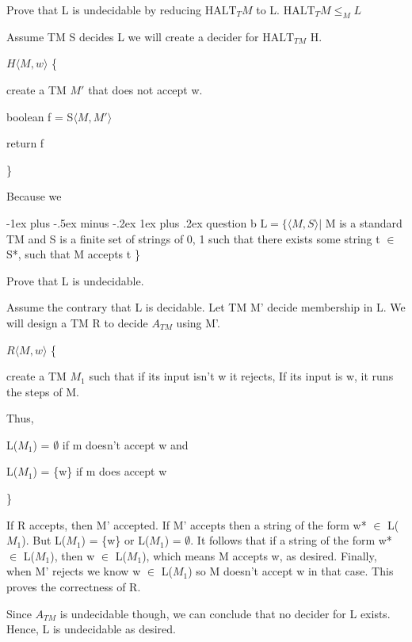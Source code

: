 \documentclass[10pt,landscape]{article}
\makeatletter
\renewcommand{\subsubsection}{\@startsection{subsubsection}{3}{0mm}%
                                {-1ex plus -.5ex minus -.2ex}%
                                {1ex plus .2ex}%
                                {\normalfont\small\bfseries}}
\makeatother
\begin{document}
\begin{multicols}{3}
Prove that L is undecidable by reducing $\mathrm{HALT}_TM$ to L.
$\mathrm{HALT}_TM \leq_M L$

Assume TM S decides L we will create a decider for $\mathrm{HALT}_{TM}$ H.

\begin{algorithm}[H]
 $H \langle{ M, w \rangle}$ \{

 create a TM $M'$ that does not accept w.

 boolean f = S$\langle{ M, M' \rangle}$
 
 return f

 \}
\end{algorithm}

Because we 

\subsubsection{question b}
$\mathrm{L} = \{ \langle{ M, S \rangle} | $ M is a standard TM and S is a finite set of strings of {0, 1} such that there exists some string t $\in$ S*, such that M accepts t  \}

Prove that L is undecidable.

Assume the contrary that L is decidable. Let TM M' decide membership in L. We will design a TM R to decide $A_{TM}$ using M'.

\begin{algorithm}[H]
 $R \langle{ M, w \rangle}$ \{

 create a TM $M_1$ such that if its input isn't w it rejects, If its input is w, it runs the steps of M.

 Thus, 

 L($M_1$) = $\emptyset$ if m doesn't accept w and

 L($M_1$) = \{w\} if m does accept w 

 \}
\end{algorithm}

If R accepts, then M' accepted. If M' accepts then a string of the form w* $\in$ L($M_1$). But L($M_1$) = \{w\} or L($M_1$) = $\emptyset$. It follows that if a string of the form w* $\in$ L($M_1$), then w $\in$ L($M_1$), which means M accepts w, as desired. Finally, when M' rejects we know w $\in$ L($M_1$) so M doesn't accept w in that case. This proves the correctness of R.

Since $A_{TM}$ is undecidable though, we can conclude that no decider for L exists. Hence, L is undecidable as desired. 




\end{multicols}
\end{document}
